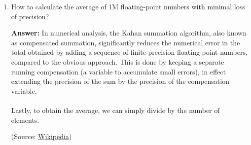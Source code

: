 \documentclass{article}
\newenvironment{QandA}{\begin{enumerate}[label=\arabic*.]}{\end{enumerate}}
\newenvironment{answer}{\par\normalfont \textbf{Answer:}}{}
\begin{document}
\begin{QandA}
\begin{answer}
\begin{enumerate}[label=\arabic*.]
\begin{enumerate}
                \item Cast gradients to FP32.
                \item Multiply the weight gradient with 1/S.
                \item Complete the weight update to the FP32 copy.
            \end{enumerate}     
        \end{enumerate}        
        Since all activations are stored in half-precision, we still end up with net reduction in memory, even though we keep 2 copies of the network (single- and half- precision).

        (Source: \href{https://docs.nvidia.com/deeplearning/performance/mixed-precision-training/index.html}{Nvidia})
    \end{answer}

    \item How to calculate the average of 1M floating-point numbers with minimal loss of precision?
    \begin{answer}
        In numerical analysis, the Kahan summation algorithm, also known as compensated summation, significantly reduces the numerical error in the total obtained by adding a sequence of finite-precision floating-point numbers, compared to the obvious approach. This is done by keeping a separate running compensation (a variable to accumulate small errors), in effect extending the precision of the sum by the precision of the compensation variable. \\\\
        Lastly, to obtain the average, we can simply divide by the number of elements. 

        (Source: \href{https://en.wikipedia.org/wiki/Kahan_summation_algorithm}{Wikipedia})
    \end{answer}


\end{QandA}
\end{document}
